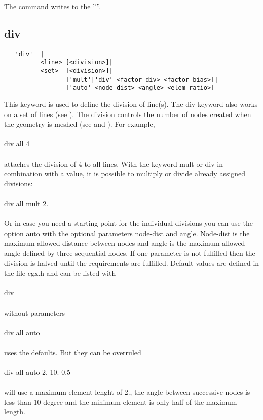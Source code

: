 \documentclass{article}
\begin{document}
The command writes to the ''''.
 
\subsection{\label{div}div}
\begin{verbatim}
   'div'  |
          <line> [<division>]|
          <set>  [<division>]|
                 ['mult'|'div' <factor-div> <factor-bias>]|
                 ['auto' <node-dist> <angle> <elem-ratio>] 
\end{verbatim}
This keyword is used to define the division of line(s).  The div keyword also works on a set of lines (see ). The division controls the number of nodes created when the geometry is meshed (see  and ). For example,\\\\
div all 4\\\\attaches the division of 4 to all lines. With the keyword mult or div in combination with a value, it is possible to multiply or divide already assigned divisions:\\\\
div all mult 2.\\\\Or in case you need a starting-point for the individual divisions you can use the option auto with the optional parameters node-dist and angle. Node-dist is the maximum allowed distance between nodes and angle is the maximum allowed angle defined by three sequential nodes. If one parameter is not fulfilled then the division is halved until the requirements are fulfilled. Default values are defined in the file cgx.h and can be listed with\\\\div\\\\without parameters\\\\
div all auto\\\\uses the defaults. But they can be overruled\\\\div all auto 2. 10. 0.5\\\\will use a maximum element lenght of 2., the angle between successive nodes is less than 10 degree and the minimum element is only half of the maximum-length.
  
\end{document}
